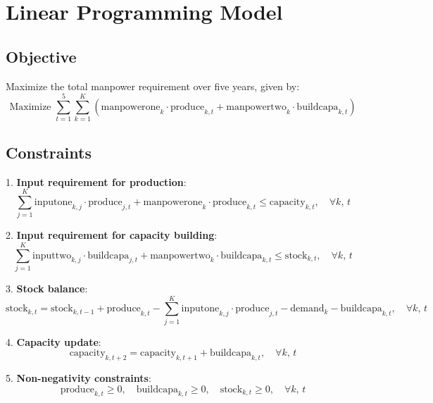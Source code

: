 \documentclass{article}
\begin{document}
\section*{Linear Programming Model}

\subsection*{Objective}
Maximize the total manpower requirement over five years, given by:
\[
\text{Maximize } \sum_{t=1}^{5} \sum_{k=1}^{K} \left( \text{manpowerone}_{k} \cdot \text{produce}_{k, t} + \text{manpowertwo}_{k} \cdot \text{buildcapa}_{k, t} \right)
\]

\subsection*{Constraints}

1. \textbf{Input requirement for production}:
   \[
   \sum_{j=1}^{K} \text{inputone}_{k, j} \cdot \text{produce}_{j, t} + \text{manpowerone}_{k} \cdot \text{produce}_{k, t} \leq \text{capacity}_{k, t}, \quad \forall k, \, t
   \]

2. \textbf{Input requirement for capacity building}:
   \[
   \sum_{j=1}^{K} \text{inputtwo}_{k, j} \cdot \text{buildcapa}_{j, t} + \text{manpowertwo}_{k} \cdot \text{buildcapa}_{k, t} \leq \text{stock}_{k, t}, \quad \forall k, \, t
   \]

3. \textbf{Stock balance}:
   \[
   \text{stock}_{k, t} = \text{stock}_{k, t-1} + \text{produce}_{k, t} - \sum_{j=1}^{K} \text{inputone}_{k, j} \cdot \text{produce}_{j, t} - \text{demand}_{k} - \text{buildcapa}_{k, t}, \quad \forall k, \, t
   \]

4. \textbf{Capacity update}:
   \[
   \text{capacity}_{k, t+2} = \text{capacity}_{k, t+1} + \text{buildcapa}_{k, t}, \quad \forall k, \, t
   \]

5. \textbf{Non-negativity constraints}:
   \[
   \text{produce}_{k, t} \geq 0, \quad \text{buildcapa}_{k, t} \geq 0, \quad \text{stock}_{k, t} \geq 0, \quad \forall k, \, t
   \]
\end{document}
